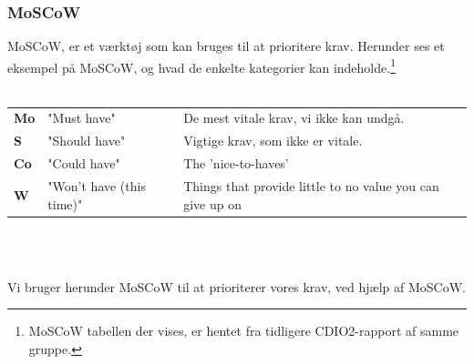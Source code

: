 \subsubsection{MoSCoW}

MoSCoW, er et værktøj som kan bruges til at prioritere krav.
Herunder ses et eksempel på MoSCoW, og hvad de enkelte kategorier kan indeholde.\footnote{MoSCoW tabellen der vises, er hentet fra tidligere CDIO2-rapport af samme gruppe.} \\\\

\begin{tabular}{lll}
    \textbf{Mo} &   
    "Must have"                 &
    De mest vitale krav, vi ikke kan undgå. \\

    \textbf{S}  &   
    "Should have"               & 
    Vigtige krav, som ikke er vitale. \\

    \textbf{Co} &   
    "Could have"                & 
    The 'nice-to-haves' \\

    \textbf{W}  &   
    "Won’t have (this time)"    & 
    Things that provide little to no value you can give up on \\

\end{tabular}
\\\\

\pagebreak

\noindent Vi bruger herunder MoSCoW til at prioriterer vores krav, ved hjælp af MoSCoW.

